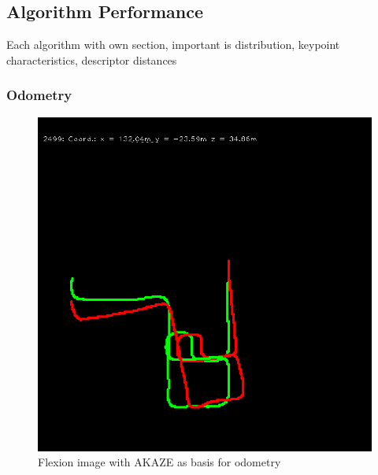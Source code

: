 \subsection{Algorithm Performance}

Each algorithm with own section, important is distribution, keypoint characteristics, descriptor distances

\subsubsection{Odometry}

\begin{figure}[H]
    \includegraphics[width=0.5\linewidth]{chapter06/odo/jonas_flexion_AKAZE.png}
    \caption{Flexion image with AKAZE as basis for odometry}
\end{figure}
